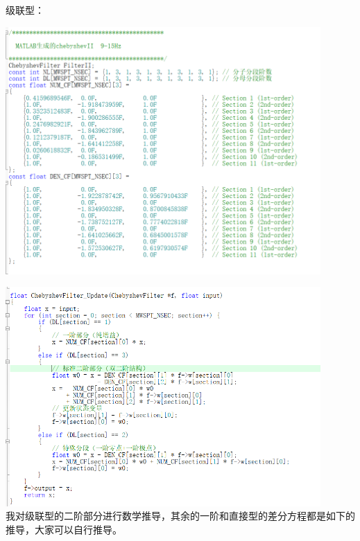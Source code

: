 \documentclass[UTF8,a4paper,12pt]{ctexart}
\begin{document}
        级联型：\\\par \includegraphics[width=12cm]{picture/chebyshev_step1.png}
        \\ \par \includegraphics[width=12cm]{picture/chebyshev_step.png}\\ 
        我对级联型的二阶部分进行数学推导，其余的一阶和直接型的差分方程都是如下的推导，大家可以自行推导。\\
\end{document}
